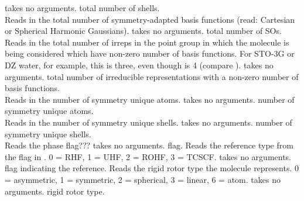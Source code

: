 {takes no arguments.}
{total number of shells.} \\
{Reads in the total number of symmetry-adapted basis functions (read:
Cartesian or Spherical Harmonic Gaussians).}
{takes no arguments.}
{total number of SOs.} \\
{Reads in the total number of irreps
in the point group in which the molecule is being considered which
have non-zero number of basis functions. For STO-3G or DZ water, for
example, this is three, even though  is 4 (compare
).}
{takes no arguments.}
{total number of irreducible representations
with a non-zero number of basis functions.} \\
{Reads in the number of symmetry unique atoms.}
{takes no arguments.}
{number of symmetry unique atoms.} \\
{Reads in the number of symmetry unique shells.}
{takes no arguments.}
{number of symmetry unique shells.} \\
{Reads the phase flag???}
{takes no arguments.}
{flag.}
{Reads the reference type from the flag in .
0 = RHF, 1 = UHF, 2 = ROHF, 3 = TCSCF.}
{takes no arguments.}
{flag indicating the reference.}
{Reads the rigid rotor type the molecule represents.
0 = asymmetric, 1 = symmetric, 2 = spherical, 3 = linear, 6 = atom.}
{takes no arguments.}
{rigid rotor type.}

